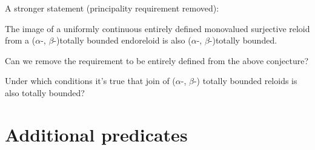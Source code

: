 A stronger statement (principality requirement removed):
\begin{conjecture}
The image of a uniformly continuous entirely defined monovalued surjective
reloid from a ($\alpha$-, $\beta$-)totally bounded endoreloid is
also ($\alpha$-, $\beta$-)totally bounded.
\end{conjecture}
Can we remove the requirement to be entirely defined from the above
conjecture?
\begin{question}
Under which conditions it's true that join of ($\alpha$-, $\beta$-)
totally bounded reloids is also totally bounded?
\end{question}

\section{Additional predicates}

